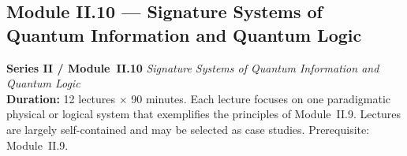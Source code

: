 \documentclass[11pt,a4paper]{article}
\begin{document}
\newpage

\subsection{Module II.10 --- Signature Systems of Quantum Information and Quantum Logic}
\label{sec:mod-II10}

\begin{tcolorbox}[seriesbox]
  \textbf{Series II / Module~II.10} \quad
  \textit{Signature Systems of Quantum Information and Quantum Logic}\\[4pt]
  \textbf{Duration:} 12 lectures $\times$ 90 minutes.
  Each lecture focuses on one paradigmatic physical or logical system
  that exemplifies the principles of Module~II.9. Lectures are largely
  self-contained and may be selected as case studies.
  Prerequisite: Module~II.9.
\end{tcolorbox}

\medskip
\end{document}
